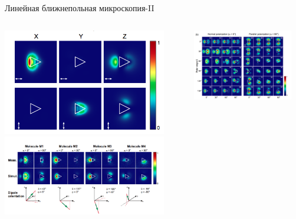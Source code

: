 \documentclass[9pt, compress, xcolor=table]{beamer}
\begin{document}
\begin{frame}{Линейная ближнепольная микроскопия-II}
\begin{columns}[c]
\column{6.5cm}
\begin{center}
\includegraphics[width=0.9\textwidth]{tr3}
\includegraphics[width=0.9\textwidth]{tr2}
\end{center}

\column{6.5cm}
\begin{center}
\includegraphics[width=0.9\textwidth]{tr4}
\end{center}


\end{columns}

\end{frame}
\end{document}
